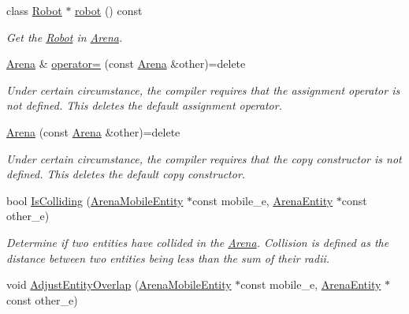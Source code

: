 \begin{DoxyCompactItemize}
class \mbox{\hyperlink{class_robot}{Robot}} $\ast$ \mbox{\hyperlink{class_arena_ab5399d939d79002a8794bf9b8a75d73a}{robot}} () const
\begin{DoxyCompactList}\small\item\em Get the \mbox{\hyperlink{class_robot}{Robot}} in \mbox{\hyperlink{class_arena}{Arena}}. \end{DoxyCompactList}\item 
\mbox{\label{class_arena_aa977a50aa4a5570a2a553705f1909e9b}} 
\mbox{\hyperlink{class_arena}{Arena}} \& \mbox{\hyperlink{class_arena_aa977a50aa4a5570a2a553705f1909e9b}{operator=}} (const \mbox{\hyperlink{class_arena}{Arena}} \&other)=delete
\begin{DoxyCompactList}\small\item\em Under certain circumstance, the compiler requires that the assignment operator is not defined. This {\ttfamily deletes} the default assignment operator. \end{DoxyCompactList}\item 
\mbox{\label{class_arena_afce6e35e1470823539dc9194bef77499}} 
\mbox{\hyperlink{class_arena_afce6e35e1470823539dc9194bef77499}{Arena}} (const \mbox{\hyperlink{class_arena}{Arena}} \&other)=delete
\begin{DoxyCompactList}\small\item\em Under certain circumstance, the compiler requires that the copy constructor is not defined. This {\ttfamily deletes} the default copy constructor. \end{DoxyCompactList}\item 
bool \mbox{\hyperlink{class_arena_ab4479b0268867602d0c4b510d5f99aff}{Is\+Colliding}} (\mbox{\hyperlink{class_arena_mobile_entity}{Arena\+Mobile\+Entity}} $\ast$const mobile\+\_\+e, \mbox{\hyperlink{class_arena_entity}{Arena\+Entity}} $\ast$const other\+\_\+e)
\begin{DoxyCompactList}\small\item\em Determine if two entities have collided in the \mbox{\hyperlink{class_arena}{Arena}}. Collision is defined as the distance between two entities being less than the sum of their radii. \end{DoxyCompactList}\item 
\mbox{\label{class_arena_a2506fab770b6070d8f061bcab4c65138}} 
void \mbox{\hyperlink{class_arena_a2506fab770b6070d8f061bcab4c65138}{Adjust\+Entity\+Overlap}} (\mbox{\hyperlink{class_arena_mobile_entity}{Arena\+Mobile\+Entity}} $\ast$const mobile\+\_\+e, \mbox{\hyperlink{class_arena_entity}{Arena\+Entity}} $\ast$const other\+\_\+e)

\end{DoxyCompactItemize}
